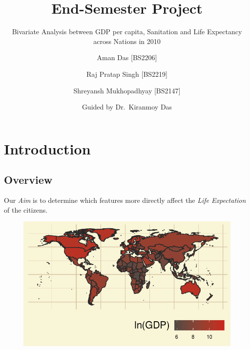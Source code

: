 \documentclass[
]{article}
\title{End-Semester Project}
\subtitle{Bivariate Analysis between GDP per capita, Sanitation and Life
Expectancy across Nations in 2010}
\author{Aman Das {[}BS2206{]} \and Raj Pratap Singh
{[}BS2219{]} \and Shreyansh Mukhopadhyay {[}BS2147{]}}
\date{Guided by Dr.~Kiranmoy Das}
\renewcommand*\contentsname{Table of contents}
\newcommand\contentsname{Table of contents}
\begin{document}
\maketitle
\ifdefined\Shaded\renewenvironment{Shaded}{\begin{tcolorbox}[frame hidden, enhanced, borderline west={3pt}{0pt}{shadecolor}, breakable, sharp corners, interior hidden, boxrule=0pt]}{\end{tcolorbox}}\fi

\renewcommand*\contentsname{Table of contents}
{
\hypersetup{linkcolor=}
\setcounter{tocdepth}{3}
\tableofcontents
}
\hypertarget{introduction}{%
\section{Introduction}\label{introduction}}

\hypertarget{overview}{%
\subsection{Overview}\label{overview}}

Our \emph{Aim} is to determine which features more directly affect the
\emph{Life Expectation} of the citizens.

\begin{figure}

\includegraphics{main_files/figure-pdf/unnamed-chunk-3-1.pdf} \hfill{}

\end{figure}
\end{document}
